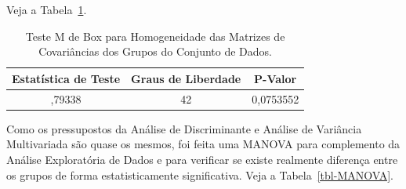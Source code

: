 \documentclass[
  portuguese,
  11pt,
]{article}
\begin{document}
\noindent Veja a Tabela~\ref{tbl-MBox}.

\begin{longtable}[]{@{}ccc@{}}

\caption{\label{tbl-MBox}Teste M de Box para Homogeneidade das Matrizes
de Covariâncias dos Grupos do Conjunto de Dados.}

\tabularnewline

\toprule\noalign{}
Estatística de Teste & Graus de Liberdade & P-Valor \\
\midrule\noalign{}
\endhead
\bottomrule\noalign{}
\endlastfoot
55,79338 & 42 & 0,0753552 \\

\end{longtable}

Como os pressupostos da Análise de Discriminante e Análise de Variância
Multivariada são quase os mesmos, foi feita uma MANOVA para complemento
da Análise Exploratória de Dados e para verificar se existe realmente
diferença entre os grupos de forma estatisticamente significativa. Veja
a Tabela~\ref{tbl-MANOVA}.

\begin{table}

\caption{\label{tbl-MANOVA}Análisede Variância Multivariada para o Fator
Grupo de Jogadores.}


\end{table}%
\end{document}
